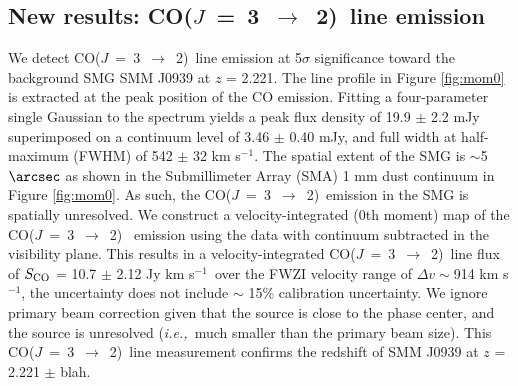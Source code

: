 \documentclass[twocolumn,apj,numberedappendix]{emulateapj}
\newcommand{\CO}{\mbox{CO($J$ = 3 $\rightarrow$ 2) }}
\newcommand{\ie}{{\sl i.e.,~}}
\newcommand{\pmOne}{$^{-1}$}
\begin{document}
\subsection{New results: \CO line emission}
We detect \CO line emission at 5$\sigma$ significance toward the background SMG SMM J0939 at $z$ = 2.221.
The line profile in Figure \ref{fig:mom0} is extracted at the peak position of the CO emission. Fitting a four-parameter single Gaussian to the spectrum yields a peak flux density of 19.9 $\pm
$ 2.2 mJy superimposed on a continuum level of 3.46 $\pm$ 0.40 mJy, and full width at half-maximum (FWHM) of 542 $\pm$ 32 km s\pmOne. 
The spatial extent of the SMG is $\sim$5$\arcsec$ as shown in the Submillimeter Array (SMA) 1 mm dust continuum in Figure \ref{fig:mom0}. As such, the \CO emission in the SMG is spatially unresolved. We construct a velocity-integrated (0th moment) map of the \CO 
emission using the data with continuum subtracted in the visibility plane. This results in a velocity-integrated \CO line flux of $S_{\rm CO}$ = 10.7 $\pm$ 2.12 Jy km s\pmOne\ over the FWZI velocity range of $\Delta v\sim$914 km s\pmOne, the uncertainty does not include $\sim$ 15\% calibration uncertainty. We ignore primary beam correction given that the source is close to the phase center, and the source is unresolved (\ie much smaller than the primary beam size). This \CO line measurement confirms the redshift of SMM J0939 at $z$ = 2.221 $\pm$ blah.
\end{document}
